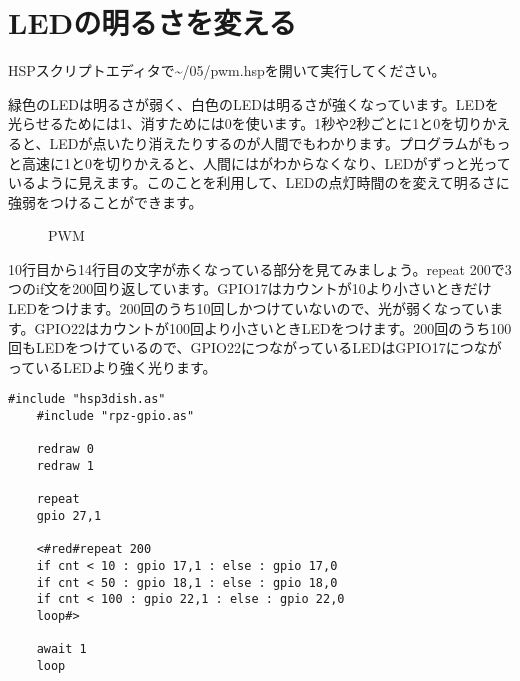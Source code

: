 \section{LEDの明るさを変える}
HSPスクリプトエディタで\textasciitilde /05/pwm.hspを開いて実行してください。

緑色のLEDは明るさが弱く、白色のLEDは明るさが強くなっています。LEDを光らせるためには1、消すためには0を使います。1秒や2秒ごとに1と0を切りかえると、LEDが点いたり消えたりするのが人間でもわかります。プログラムがもっと高速に1と0を切りかえると、人間にはがわからなくなり、LEDがずっと光っているように見えます。このことを利用して、LEDの点灯時間のを変えて明るさに強弱をつけることができます。

\begin{figure}[H]
\centering

\caption{PWM}
\end{figure}

10行目から14行目の文字が赤くなっている部分を見てみましょう。repeat 200で3つのif文を200回り返しています。GPIO17はカウントが10より小さいときだけLEDをつけます。200回のうち10回しかつけていないので、光が弱くなっています。GPIO22はカウントが100回より小さいときLEDをつけます。200回のうち100回もLEDをつけているので、GPIO22につながっているLEDはGPIO17につながっているLEDより強く光ります。

\begin{lstlisting}[caption=pwm.hsp,label=pwm.hsp]
    #include "hsp3dish.as"
    #include "rpz-gpio.as"
    
    redraw 0
    redraw 1
    
    repeat
    gpio 27,1
    
    <#red#repeat 200
    if cnt < 10 : gpio 17,1 : else : gpio 17,0
    if cnt < 50 : gpio 18,1 : else : gpio 18,0
    if cnt < 100 : gpio 22,1 : else : gpio 22,0
    loop#>
    
    await 1
    loop
    \end{lstlisting}
